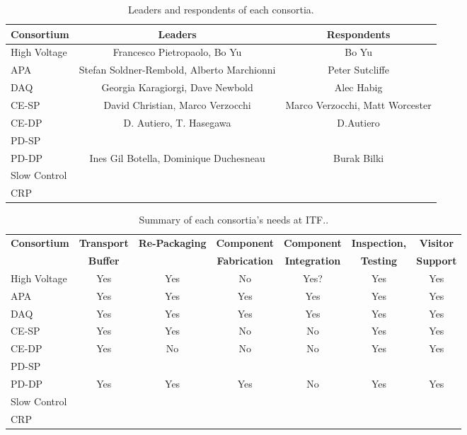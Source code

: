 \begin{table}[htbp]
\caption{Leaders and respondents of each consortia.}
\label{table:leders}
\begin{center}
\begin{tabular}{|l|c|c|} 
\hline
{\bf Consortium} & {\bf Leaders} &{\bf Respondents} \\
\hline
High Voltage & Francesco Pietropaolo, Bo Yu & Bo Yu \\ 
\hline
APA & Stefan Soldner-Rembold, Alberto Marchionni & Peter Sutcliffe \\ 
\hline
DAQ & Georgia Karagiorgi, Dave Newbold & Alec Habig \\ 
\hline
CE-SP & David Christian, Marco Verzocchi  & Marco Verzocchi, Matt Worcester\\ 
\hline
CE-DP & D. Autiero, T. Hasegawa &  D.Autiero  \\ 
\hline
PD-SP & & \\ 
\hline
PD-DP & Ines Gil Botella, Dominique Duchesneau & Burak Bilki \\ 
\hline
Slow Control & &   \\ 
\hline
CRP & &  \\   
\hline
\end{tabular}
\end{center}
\end{table}

\begin{table}[htbp]
\caption{Summary of each consortia's needs at ITF..}
\label{table:responses}
\begin{center}
\scalebox{0.95}
{
\begin{tabular}{|l|c|c|c|c|c|c| } 
\hline
{\bf Consortium} & {\bf Transport} &{\bf Re-Packaging}&{\bf Component}
&{\bf Component}&{\bf Inspection,}&{\bf Visitor} \\
 & {\bf Buffer} &{\bf }&{\bf Fabrication}
&{\bf Integration}&{\bf Testing}&{\bf Support} \\
\hline 
High Voltage & Yes & Yes & No & Yes? & Yes & Yes \\ 
\hline
APA & Yes & Yes & Yes & Yes & Yes & Yes \\ 
\hline
DAQ & Yes & Yes & Yes & Yes & Yes & Yes \\ 
\hline
CE-SP & Yes & Yes & No & No & Yes & Yes \\ 
\hline
CE-DP & Yes & No & No & No & Yes & Yes \\ 
\hline
PD-SP & & & & & &  \\ 
\hline
PD-DP & Yes & Yes & Yes & No & Yes & Yes \\ 
\hline
Slow Control & & & & & &  \\ 
\hline
CRP & & & & & &  \\   
\hline
\end{tabular}
}
\end{center}
\end{table}

